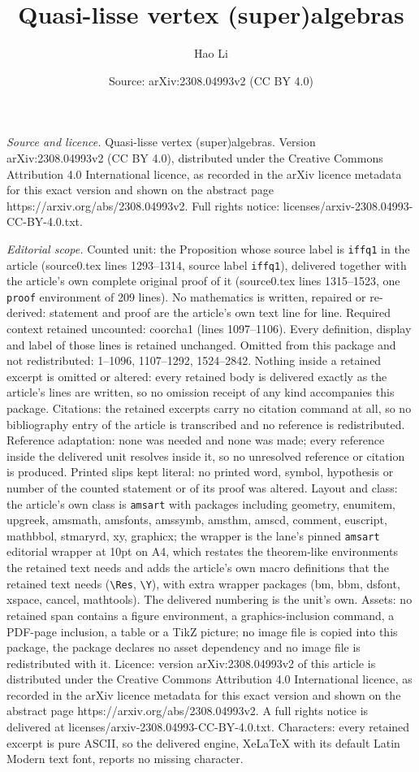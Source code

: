 \documentclass[10pt,a4paper]{amsart}
\title[Quasi-lisse vertex (super)algebras]{Quasi-lisse vertex (super)algebras}
\author{Hao Li}
\date{Source: arXiv:2308.04993v2 (CC BY 4.0)}
\begin{document}
\maketitle

\noindent\emph{Source and licence.} Quasi-lisse vertex (super)algebras. Version arXiv:2308.04993v2 (CC BY 4.0), distributed under the Creative Commons Attribution 4.0 International licence, as recorded in the arXiv licence metadata for this exact version and shown on the abstract page https://arxiv.org/abs/2308.04993v2. Full rights notice: licenses/arxiv-2308.04993-CC-BY-4.0.txt.\par\smallskip

\noindent\textit{Editorial scope.} Counted unit: the Proposition whose source label is \texttt{iffq1} in the article (source0.tex lines 1293--1314, source label \texttt{iffq1}), delivered together with the article's own complete original proof of it (source0.tex lines 1315--1523, one \texttt{proof} environment of 209 lines). No mathematics is written, repaired or re-derived: statement and proof are the article's own text line for line. Required context retained uncounted: coorcha1 (lines 1097--1106). Every definition, display and label of those lines is retained unchanged. Omitted from this package and not redistributed: 1--1096, 1107--1292, 1524--2842. Nothing inside a retained excerpt is omitted or altered: every retained body is delivered exactly as the article's lines are written, so no omission receipt of any kind accompanies this package. Citations: the retained excerpts carry no citation command at all, so no bibliography entry of the article is transcribed and no reference is redistributed. Reference adaptation: none was needed and none was made; every reference inside the delivered unit resolves inside it, so no unresolved reference or citation is produced. Printed slips kept literal: no printed word, symbol, hypothesis or number of the counted statement or of its proof was altered. Layout and class: the article's own class is \texttt{amsart} with packages including geometry, enumitem, upgreek, amsmath, amsfonts, amssymb, amsthm, amscd, comment, euscript, mathbbol, stmaryrd, xy, graphicx; the wrapper is the lane's pinned \texttt{amsart} editorial wrapper at 10pt on A4, which restates the theorem-like environments the retained text needs and adds the article's own macro definitions that the retained text needs (\texttt{\textbackslash Res}, \texttt{\textbackslash Y}), with extra wrapper packages (bm, bbm, dsfont, xspace, cancel, mathtools). The delivered numbering is the unit's own. Assets: no retained span contains a figure environment, a graphics-inclusion command, a PDF-page inclusion, a table or a TikZ picture; no image file is copied into this package, the package declares no asset dependency and no image file is redistributed with it. Licence: version arXiv:2308.04993v2 of this article is distributed under the Creative Commons Attribution 4.0 International licence, as recorded in the arXiv licence metadata for this exact version and shown on the abstract page https://arxiv.org/abs/2308.04993v2. A full rights notice is delivered at licenses/arxiv-2308.04993-CC-BY-4.0.txt. Characters: every retained excerpt is pure ASCII, so the delivered engine, XeLaTeX with its default Latin Modern text font, reports no missing character.
\end{document}
